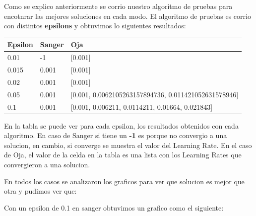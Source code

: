 Como se explico anteriormente se corrio nuestro algoritmo de pruebas para encotnrar las mejores soluciones en cada modo. El algoritmo de pruebas es corrio con distintos \textbf{epsilons} y obtuvimos lo siguientes resultados:

\begin{tabular}{|l|l|l|}
\hline
Epsilon & Sanger & Oja \\ \hline
0.01           & -1      	& [0.001]  \\ \hline
0.015          & 0.001      & [0.001]   \\ \hline
0.02           & 0.001      & [0.001]   \\ \hline
0.05           & 0.001      & [0.001, 0.0062105263157894736, 0.011421052631578946]   \\ \hline
0.1            & 0.001      & [0.001, 0.006211, 0.0114211, 0.01664, 0.021843]   \\ \hline

\end{tabular}


En la tabla se puede ver para cada epsilon, los resultados obtenidos con cada algoritmo. En caso de Sanger si tiene un \textbf{-1} es porque no convergio a una solucion, en cambio, si converge se muestra el valor del Learning Rate. En el caso de Oja, el valor de la celda en la tabla es una lista con los Learning Rates que convergieron a una solucion.

En todos los casos se analizaron los graficos para ver que solucion es mejor que otra y pudimos ver que:

Con un epsilon de 0.1 en sanger obtuvimos un grafico como el siguiente:


